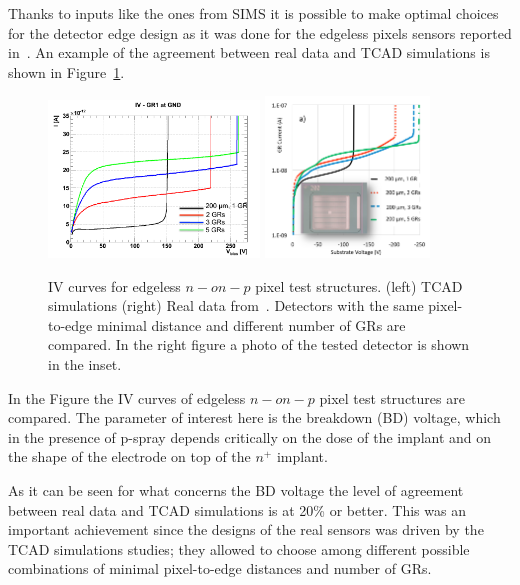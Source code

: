 Thanks to inputs like the ones from SIMS it is possible to make optimal choices for the detector 
edge design as it was done for the edgeless pixels sensors reported in~\cite{bib:nim2012}. 
An example of the agreement between real data and TCAD simulations is shown in 
Figure~\ref{fig:IV_BD}.
\begin{figure}[!htbp]
\centering
\includegraphics[width=0.5\textwidth]{IV_simulations}
\includegraphics[width=0.39\textwidth]{IV_data}
\caption{\label{fig:IV_BD}IV curves for edgeless $n-on-p$ pixel test structures. (left) TCAD simulations 
(right) Real data from~\cite{bib:nim2012}. Detectors with the same pixel-to-edge minimal distance 
and different number of GRs are compared. In the right figure a photo of the tested detector is 
shown in the inset.}
\end{figure}
In the Figure the IV curves of edgeless $n-on-p$ pixel test structures are compared. The 
parameter of interest here is the breakdown (BD) voltage, which in the presence of 
p-spray depends critically on the dose of the implant and on the shape of the electrode 
on top of the $n^+$ implant. 

As it can be seen for what concerns the BD voltage the level of agreement between real data 
and TCAD simulations is at 20\% or better. This was an important achievement since 
the designs of the real sensors was driven by the TCAD simulations studies; they allowed 
to choose among different possible combinations of minimal pixel-to-edge distances and 
number of GRs. 


